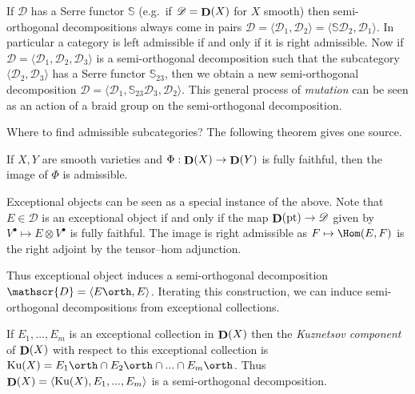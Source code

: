 \begin{remark}
    If \(\mathscr{D}\) has a Serre functor \(\mathbb{S}\) (e.g.\ if
    \(\mathscr{D}=\mathop{\mathbf{D}}(X)\) for \(X\) smooth) then
    semi-orthogonal decompositions always come in pairs \(\mathscr{D}=\langle
    \mathscr{D}_1,\mathscr{D}_2 \rangle = \langle \mathbb{S}\mathscr{D}_2,
    \mathscr{D}_1 \rangle\). In particular a category is left admissible if and
    only if it is right admissible. Now if \(\mathscr{D}=\langle
    \mathscr{D}_1,\mathscr{D}_2,\mathscr{D}_3\rangle\) is a semi-orthogonal
    decomposition such that the subcategory \(\langle \mathscr{D}_2,
    \mathscr{D}_3\rangle\) has a Serre functor \(\mathbb{S}_{23}\), then we
    obtain a new semi-orthogonal decomposition \(\mathscr{D}=\langle
    \mathscr{D}_1, \mathbb{S}_{23}\mathscr{D}_3,\mathscr{D}_2\rangle\). This
    general process of \textit{mutation} can be seen as an action of a braid
    group on the semi-orthogonal decomposition.
\end{remark}

Where to find admissible subcategories? The following theorem gives one source.

\begin{theorem}
    If \(X,Y\) are smooth varieties and \(\Phi:\mathop{\mathbf{D}}(X)\to \mathop{\mathbf{D}}(Y)\) is fully faithful,
    then the image of \(\Phi\) is admissible.
\end{theorem}

Exceptional objects can be seen as a special instance of the above. Note that \(E\in \mathscr{D}\) is an exceptional object if and only if the map
\(\mathop{\mathbf{D}}(\text{pt})\to \mathscr{D}\) given by \(V^\bullet \mapsto E\otimes
V^\bullet\) is fully faithful. The image is right admissible as \(F\mapsto
\Hom(E,F)\) is the right adjoint by the tensor--hom adjunction.

Thus exceptional object induces a semi-orthogonal decomposition
\(\mathscr{D}=\langle E\orth, E\rangle\). Iterating this construction, we can
induce semi-orthogonal decompositions from exceptional collections.

\begin{definition}
    If \(E_1,...,E_m\) is an exceptional collection in \(\mathop{\mathbf{D}}(X)\) then the
    \textit{Kuznetsov component} of \(\mathop{\mathbf{D}}(X)\) with respect to this exceptional
    collection is \(\text{Ku}(X)=E_1\orth \cap E_2\orth \cap ... \cap
    E_m\orth\). Thus \(\mathop{\mathbf{D}}(X)=\langle \text{Ku}(X),E_1,...,E_m\rangle\) is a
    semi-orthogonal decomposition.
\end{definition}

